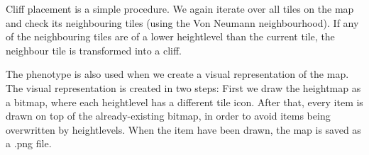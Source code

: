 Cliff placement is a simple procedure. We again iterate over all tiles on the map and check its neighbouring tiles (using the Von Neumann neighbourhood). If any of the neighbouring tiles are of a lower heightlevel than the current tile, the neighbour tile is transformed into a cliff.

The phenotype is also used when we create a visual representation of the map. The visual representation is created in two steps: First we draw the heightmap as a bitmap, where each heightlevel has a different tile icon. After that, every item is drawn on top of the already-existing bitmap, in order to avoid items being overwritten by heightlevels. When the item have been drawn, the map is saved as a .png file.